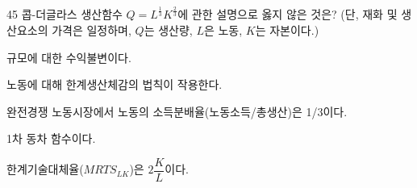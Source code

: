 \begin{question}{45}
콥-더글라스 생산함수 $Q=L^{\frac{1}{3}}K^{\frac{2}{3}}$에 관한 설명으로 옳지 않은 것은? (단, 재화 및 생산요소의 가격은 일정하며, $Q$는 생산량, $L$은 노동, $K$는 자본이다.)
\begin{choices}
  \item 규모에 대한 수익불변이다.
  \item 노동에 대해 한계생산체감의 법칙이 작용한다.
  \item 완전경쟁 노동시장에서 노동의 소득분배율(노동소득/총생산)은 1/3이다.
  \item 1차 동차 함수이다.
  \item 한계기술대체율($MRTS_{LK}$)은 $2\dfrac{K}{L}$이다.
\end{choices}
\end{question}
